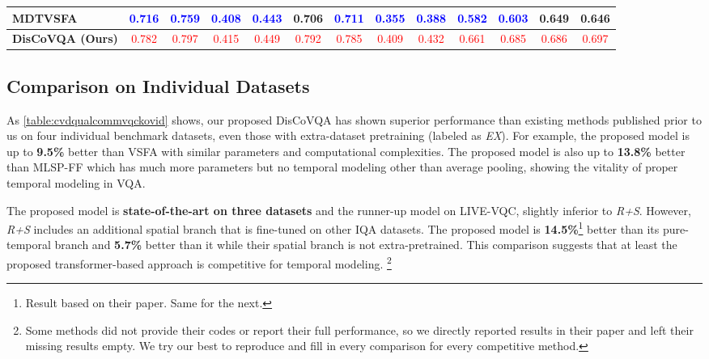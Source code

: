 \documentclass[journal]{IEEEtran}
\newcommand{\blue}[1]{\textcolor{blue}{#1}}
\newcommand{\textbfred}[1]{\textcolor{red}{{#1}}}
\begin{document}
\begin{table*}[]
{\begin{tabular}{l|cc|cc|cc|cc|cc|cc}
MDTVSFA\cite{mdtvsfa}                     & \blue{0.716}                        & \blue{0.759}    & \blue{0.408} &  \blue{0.443}                 & 0.706                         & \blue{0.711}  & \blue{0.355} &  \blue{0.388}      & \blue{0.582}                        & \blue{0.603}   & 0.649 &   0.646                          \\ \hline
\textbf{DisCoVQA (Ours)}             & \textbfred{0.782}               & \textbfred{0.797}       & \textbfred{0.415} & \textbfred{0.449}    & \textbfred{0.792}               & \textbfred{0.785}  & \textbfred{0.409} & \textbfred{0.432}   & \textbfred{0.661}               & \textbfred{0.685}       &  \textbfred{0.686} &   \textbfred{0.697}                 \\ \hline
\end{tabular}}
\end{table*}


\subsection{Comparison on Individual Datasets}

As \cref{table:cvdqualcommvqckovid} shows, our proposed DisCoVQA has shown superior performance than existing methods published prior to us on four individual benchmark datasets, even those with extra-dataset pretraining (labeled as \textit{EX}). For example, the proposed model is up to \textbf{9.5\%} better than VSFA\cite{vsfa} with similar parameters and computational complexities. The proposed model is also up to \textbf{13.8\%} better than MLSP-FF which has much more parameters but no temporal modeling other than average pooling, showing the vitality of proper temporal modeling in VQA.

The proposed model is \textbf{state-of-the-art on three datasets} and the runner-up model on LIVE-VQC, slightly inferior to \textit{R+S}\cite{bvqa2022}. However, \textit{R+S} includes an additional spatial branch that is fine-tuned on other IQA datasets. The proposed model is \textbf{14.5\%}\footnote{Result based on their paper. Same for the next.} better than its pure-temporal branch and \textbf{5.7\%} better than it while their spatial branch is not extra-pretrained. This comparison suggests that at least the proposed transformer-based approach is competitive for temporal modeling. \footnote{Some methods did not provide their codes or report their full performance, so we directly reported results in their paper and left their missing results empty. We try our best to reproduce and fill in every comparison for every competitive method.} 
\end{document}
